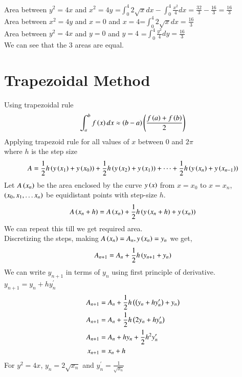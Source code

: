 \documentclass[journal,12pt,onecolumn]{IEEEtran}
\theoremstyle{remark}
\begin{document}
Area between $y^2=4x$ and $x^2=4y$ =$\int_{0}^{4} 2\sqrt{x} dx-\int_{0}^{4} \frac{x^2}{4} dx=\frac{32}{3}-\frac{16}{3}=\frac{16}{3}$\\
Area between $x^2=4y$ and $x=0$ and $x=4$=$\int_{0}^{4} 2\sqrt{x} dx=\frac{16}{3}$\\
Area between $y^2=4x$ and $y=0$ and $y=4$ =$\int_{0}^{4} \frac{y^2}{4} dy=\frac{16}{3}$\\
We can see that the $3$ areas are equal.\\
\section{Trapezoidal Method}
Using trapezoidal rule 
\begin{align*}
    \int_{a}^{b} f\left(x\right)dx \approx \left(b-a\right)\left(\frac{f\left(a\right)+f\left(b\right)}{2}\right)
\end{align*}
Applying trapezoid rule for all values of $x$ between $0$ and $2\pi$\\
where $h$ is the step size 
\begin{align*}
    A&=\frac{1}{2}h\left(y\left(x_1\right)+y\left(x_0\right)\right)+ \frac{1}{2}h\left(y\left(x_2\right)+y\left(x_1\right)\right)+\dots+\frac{1}{2}h\left(y\left(x_n\right)+y\left(x_{n-1}\right)\right)\\
\end{align*}
Let $A\left(x_n\right)$ be the area enclosed by the curve $y\left(x\right)$ from $x=x_0$ to $x=x_n$, $\left(x_0, x_1, \dots x_n\right)$ be equidistant points with step-size $h$.
\begin{align}
  A\left(x_n+h\right)=A\left(x_n\right)+\frac{1}{2}h\left(y\left(x_n+h\right)+y\left(x_n\right)\right)
\end{align}
We can repeat this till we get required area.\\
Discretizing the steps, making $A\left(x_n\right)=A_n, y\left(x_n\right)=y_n$ we get,
\begin{align}
 A_{n+1}=A_n+\frac{1}{2}h\left(y_{n+1}+y_n\right)
\end{align}
We can write $y_{n+1}$ in terms of $y_n$ using first principle of derivative. $y_{n+1}=y_n+hy^{\prime}_n$
\begin{align}
  A_{n+1}&=A_n+\frac{1}{2}h\left(\left(y_{n}+hy^{\prime}_n\right)+y_n\right)\\
  A_{n+1}&=A_n+\frac{1}{2}h\left(2y_n+hy^{\prime}_n\right)\\
  A_{n+1}&=A_n+hy_n+\frac{1}{2}h^2y^{\prime}_n\\
  x_{n+1}&=x_n+h
\end{align}
For $y^2=4x$, $y_n=2\sqrt{x_n}$ and $y^{\prime}_n= \frac{1}{\sqrt{x_n}}$\\
\end{document}
